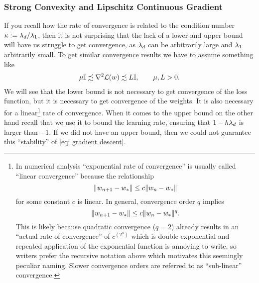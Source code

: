 \subsubsection{Strong Convexity and Lipschitz Continuous Gradient}

If you recall how the rate of convergence is related to the condition number
\(\kappa:=\lambda_d/\lambda_1\), then it is not surprising that
the lack of a lower and upper bound will have us struggle to get convergence, as
\(\lambda_d\) can be arbitrarily large and \(\lambda_1\) arbitrarily
small. To get similar convergence results we have to assume something like
%
\begin{align}\label{eq: upper lower bound on hesse matrix}
	\mu \mathbb{I} \precsim \nabla^2 \mathcal{L}(w) \precsim L \mathbb{I}, \qquad \mu,L >0.
\end{align}
%
We will see that the lower bound is not necessary to get convergence of the
loss function, but it is necessary to get convergence of the weights. It is
also necessary for a linear\footnote{
	In numerical analysis  ``exponential rate of convergence'' is usually called
	``linear convergence'' because the relationship
	\[
		\|w_{n+1} - w_*\| \le c \|w_n - w_*\|
	\]
	for some constant \(c\) is linear. In general, convergence order \(q\) implies
	\[
		\|w_{n+1} -w_*\| \le c\|w_n - w_*\|^q.
	\]
	This is likely because quadratic convergence (\(q=2\)) already results in an ``actual
	rate of convergence'' of \(c^{\left(2^n\right)}\) which is double exponential and
	repeated application of the exponential function is annoying to write, so
	writers prefer the recursive notation above which motivates this seemingly
	peculiar naming. Slower convergence orders are referred to as ``sub-linear''
	convergence.
}
rate of convergence. When it comes to the upper bound on the other hand recall
that we use it to bound the learning rate, ensuring that
\(1-h\lambda_d\) is larger than \(-1\). If we did not have an upper
bound, then we could not guarantee this ``stability'' of \ref{eq: gradient descent}.

